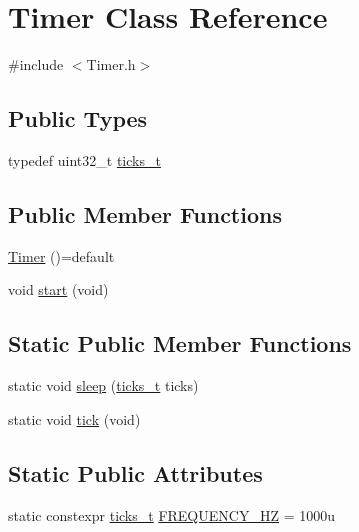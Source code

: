 \hypertarget{class_timer}{}\section{Timer Class Reference}
\label{class_timer}


{\ttfamily \#include $<$Timer.\+h$>$}

\subsection*{Public Types}
\begin{DoxyCompactItemize}
\item 
typedef uint32\+\_\+t \hyperlink{class_timer_af064c6652d9c7424aa2a69091077371d}{ticks\+\_\+t}
\end{DoxyCompactItemize}
\subsection*{Public Member Functions}
\begin{DoxyCompactItemize}
\item 
\hyperlink{class_timer_a8ed3c5e074223900c0c9a74376471209}{Timer} ()=default
\item 
void \hyperlink{class_timer_abb13e798f6d89b09fdc9182d64c7558b}{start} (void)
\end{DoxyCompactItemize}
\subsection*{Static Public Member Functions}
\begin{DoxyCompactItemize}
\item 
static void \hyperlink{class_timer_ad946179cf9404a33927ec3d33ed270d7}{sleep} (\hyperlink{class_timer_af064c6652d9c7424aa2a69091077371d}{ticks\+\_\+t} ticks)
\item 
static void \hyperlink{class_timer_afba5678215b6aa1983edf2c08241c99b}{tick} (void)
\end{DoxyCompactItemize}
\subsection*{Static Public Attributes}
\begin{DoxyCompactItemize}
\item 
static constexpr \hyperlink{class_timer_af064c6652d9c7424aa2a69091077371d}{ticks\+\_\+t} \hyperlink{class_timer_afb0566d18137755123193fc239593daa}{F\+R\+E\+Q\+U\+E\+N\+C\+Y\+\_\+\+HZ} = 1000u
\end{DoxyCompactItemize}


